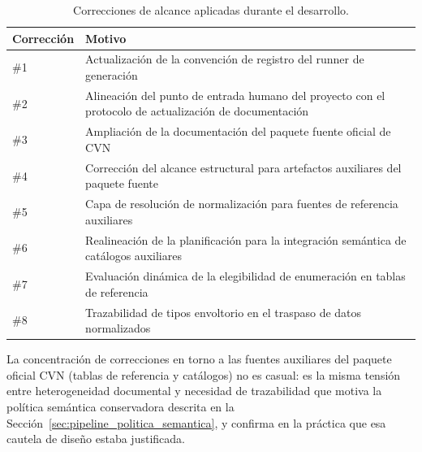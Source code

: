 \begin{table}[htbp]
  \centering
  \footnotesize
  \renewcommand{\arraystretch}{1.45}
  \caption{Correcciones de alcance aplicadas durante el desarrollo.}
  \label{tab:anexo_desarrollo_hotfixes}
  \begin{tabular}{p{} p{}}
    \hline
    \textbf{Corrección} & \textbf{Motivo} \\
    \hline
    \#1 & Actualización de la convención de registro del runner de generación \\
    \#2 & Alineación del punto de entrada humano del proyecto con el protocolo de actualización de documentación \\
    \#3 & Ampliación de la documentación del paquete fuente oficial de CVN \\
    \#4 & Corrección del alcance estructural para artefactos auxiliares del paquete fuente \\
    \#5 & Capa de resolución de normalización para fuentes de referencia auxiliares \\
    \#6 & Realineación de la planificación para la integración semántica de catálogos auxiliares \\
    \#7 & Evaluación dinámica de la elegibilidad de enumeración en tablas de referencia \\
    \#8 & Trazabilidad de tipos envoltorio en el traspaso de datos normalizados \\
    \hline
  \end{tabular}
\end{table}

La concentración de correcciones en torno a las fuentes auxiliares del
paquete oficial CVN (tablas de referencia y catálogos) no es casual: es la
misma tensión entre heterogeneidad documental y necesidad de trazabilidad
que motiva la política semántica conservadora descrita en la
Sección~\ref{sec:pipeline_politica_semantica}, y confirma en la práctica que
esa cautela de diseño estaba justificada.
